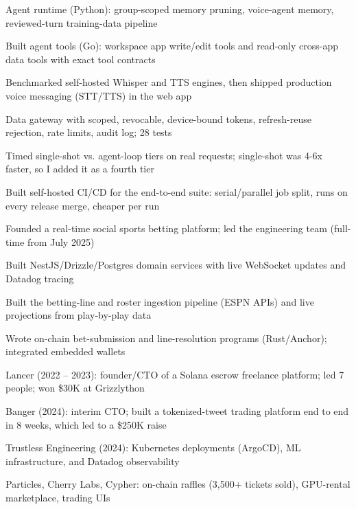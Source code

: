 \documentclass[print]{jack-resume}
\begin{document}
\begin{tightemize}
    \item Agent runtime (Python): group-scoped memory pruning, voice-agent memory, reviewed-turn training-data pipeline
    \item Built agent tools (Go): workspace app write/edit tools and read-only cross-app data tools with exact tool contracts
    \item Benchmarked self-hosted Whisper and TTS engines, then shipped production voice messaging (STT/TTS) in the web app
    \item Data gateway with scoped, revocable, device-bound tokens, refresh-reuse rejection, rate limits, audit log; 28 tests
    \item Timed single-shot vs. agent-loop tiers on real requests; single-shot was 4-6x faster, so I added it as a fourth tier
    \item Built self-hosted CI/CD for the end-to-end suite: serial/parallel job split, runs on every release merge, cheaper per run
\end{tightemize}
\sectionsep

\begin{tightemize}
    \item Founded a real-time social sports betting platform; led the engineering team (full-time from July 2025)
    \item Built NestJS/Drizzle/Postgres domain services with live WebSocket updates and Datadog tracing
    \item Built the betting-line and roster ingestion pipeline (ESPN APIs) and live projections from play-by-play data
    \item Wrote on-chain bet-submission and line-resolution programs (Rust/Anchor); integrated embedded wallets
\end{tightemize}
\sectionsep

\begin{tightemize}
    \item Lancer (2022 – 2023): founder/CTO of a Solana escrow freelance platform; led 7 people; won \$30K at Grizzlython
    \item Banger (2024): interim CTO; built a tokenized-tweet trading platform end to end in 8 weeks, which led to a \$250K raise
    \item Trustless Engineering (2024): Kubernetes deployments (ArgoCD), ML infrastructure, and Datadog observability
    \item Particles, Cherry Labs, Cypher: on-chain raffles (3,500+ tickets sold), GPU-rental marketplace, trading UIs
\end{tightemize}
\sectionsep
\end{document}
